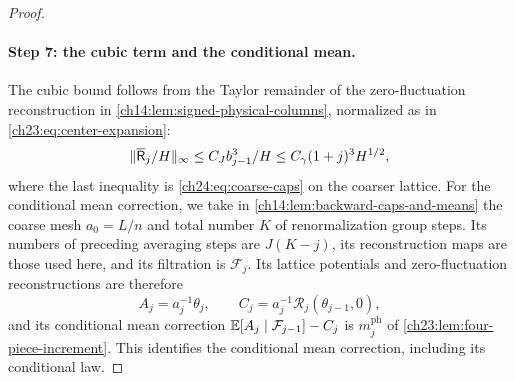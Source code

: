 \begin{proof}
\paragraph{Step 7: the cubic term and the conditional mean.}
The cubic bound follows from the Taylor remainder of the zero-fluctuation reconstruction in \cref{ch14:lem:signed-physical-columns}, normalized as in \eqref{ch23:eq:center-expansion}:
\[
 \lVert \overline{\mathsf R}_j/H\rVert_\infty\le C_Jb_{j-1}^3/H\le C_\gamma(1+j)^3H^{1/2},
\]
where the last inequality is \eqref{ch24:eq:coarse-caps} on the coarser lattice. For the conditional mean correction, we take in \cref{ch14:lem:backward-caps-and-means} the coarse mesh $a_0=L/n$ and total number $K$ of renormalization group steps. Its numbers of preceding averaging steps are $J(K-j)$, its reconstruction maps are those used here, and its filtration is $\mathcal F_j$. Its lattice potentials and zero-fluctuation reconstructions are therefore
\[
 A_j=a_j^{-1}\theta_j,\qquad C_j=a_j^{-1}\mathscr R_j(\theta_{j-1},0),
\]
and its conditional mean correction $\mathbb E[A_j\mid\mathcal F_{j-1}]-C_j$ is $m_j^{\mathrm{ph}}$ of \cref{ch23:lem:four-piece-increment}. This identifies the conditional mean correction, including its conditional law.


\end{proof}

